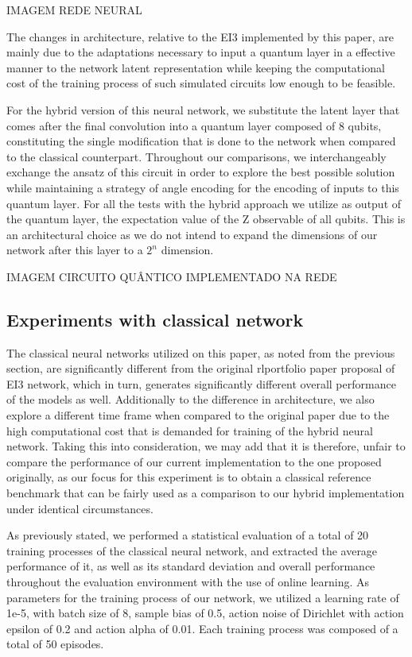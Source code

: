 IMAGEM REDE NEURAL

The changes in architecture, relative to the EI3 implemented by this paper, are mainly due to the adaptations necessary to input a quantum layer in a effective manner to the network latent representation while keeping the computational cost of the training process of such simulated circuits low enough to be feasible.

For the hybrid version of this neural network, we substitute the latent layer that comes after the final convolution into a quantum layer composed of 8 qubits, constituting the single modification that is done to the network when compared to the classical counterpart. Throughout our comparisons, we interchangeably exchange the ansatz of this circuit in order to explore the best possible solution while maintaining a strategy of angle encoding for the encoding of inputs to this quantum layer. For all the tests with the hybrid approach we utilize as output of the quantum layer, the expectation value of the Z observable of all qubits. This is an architectural choice as we do not intend to expand the dimensions of our network after this layer to a $2^n$ dimension.

IMAGEM CIRCUITO QUÂNTICO IMPLEMENTADO NA REDE

\subsection{Experiments with classical network}
The classical neural networks utilized on this paper, as noted from the previous section, are significantly different from the original rlportfolio \cite{RLportfolio} paper proposal of EI3 network, which in turn, generates significantly different overall performance of the models as well. Additionally to the difference in architecture, we also explore a different time frame when compared to the original paper due to the high computational cost that is demanded for training of the hybrid neural network. Taking this into consideration, we may add that it is therefore, unfair to compare the performance of our current implementation to the one proposed originally, as our focus for this experiment is to obtain a classical reference benchmark that can be fairly used as a comparison to our hybrid implementation under identical circumstances.

As previously stated, we performed a statistical evaluation of a total of 20 training processes of the classical neural network, and extracted the average performance of it, as well as its standard deviation and overall performance throughout the evaluation environment with the use of online learning. As parameters for the training process of our network, we utilized a learning rate of 1e-5, with batch size of 8, sample bias of 0.5, action noise of Dirichlet with action epsilon of 0.2 and action alpha of 0.01. Each training process was composed of a total of 50 episodes.

